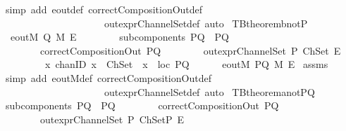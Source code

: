 \begin{isabellebody}
\ {\isacharparenleft}simp\ add{\isacharcolon}\ eout{\isacharunderscore}def\ correctCompositionOut{\isacharunderscore}def\ \isanewline
\ \ \ \ \ \ \ \ \ \ \ \ \ \ \ \ \ \ \ \ \ out{\isacharunderscore}exprChannelSet{\isacharunderscore}def{\isacharcomma}\ auto{\isacharparenright}%
\endisatagproof
{\isafoldproof}%
%
\isadelimproof
\isanewline
%
\endisadelimproof
\isanewline
{}\isamarkupfalse%
\ TBtheorem{}b{\isacharunderscore}notP{}{\isacharcolon}\isanewline
{}\ {\isachardoublequoteopen}{\isasymnot}\ eoutM\ Q\ M\ E{\isachardoublequoteclose}\isanewline
\ \ \ \ \ \ \ \ {\isachardoublequoteopen}subcomponents\ PQ\ {\isacharequal}\ {\isacharbraceleft}P{\isacharcomma}Q{\isacharbraceright}{\isachardoublequoteclose}\isanewline
\ \ \ \ \ \ \ \ {\isachardoublequoteopen}correctCompositionOut\ PQ{\isachardoublequoteclose}\isanewline
\ \ \ \ \ \ \ \ {\isachardoublequoteopen}out{\isacharunderscore}exprChannelSet\ P\ ChSet\ E{\isachardoublequoteclose}\isanewline
\ \ \ \ \ \ \ \ {\isachardoublequoteopen}{\isasymforall}\ {\isacharparenleft}x\ {\isacharcolon}{\isacharcolon}chanID{\isacharparenright}{\isachardot}\ {\isacharparenleft}{\isacharparenleft}x\ {\isasymin}\ ChSet{\isacharparenright}\ {\isasymlongrightarrow}\ {\isacharparenleft}x\ {\isasymin}\ {\isacharparenleft}loc\ PQ{\isacharparenright}{\isacharparenright}{\isacharparenright}{\isachardoublequoteclose}\ \isanewline
{}\ \ \ \ {\isachardoublequoteopen}{\isasymnot}\ eoutM\ PQ\ M\ E{\isachardoublequoteclose}\isanewline
%
\isadelimproof
%
\endisadelimproof
%
\isatagproof
{}\isamarkupfalse%
\ assms\isanewline
{}\isamarkupfalse%
\ {\isacharparenleft}simp\ add{\isacharcolon}\ eoutM{\isacharunderscore}def\ correctCompositionOut{\isacharunderscore}def\ \isanewline
\ \ \ \ \ \ \ \ \ \ \ \ \ \ \ \ \ \ \ \ \ out{\isacharunderscore}exprChannelSet{\isacharunderscore}def{\isacharcomma}\ auto{\isacharparenright}%
\endisatagproof
{\isafoldproof}%
%
\isadelimproof
\isanewline
%
\endisadelimproof
\isanewline
{}\isamarkupfalse%
\ TBtheorem{}a{\isacharunderscore}notPQ{\isacharcolon}\isanewline
{}\ {\isachardoublequoteopen}subcomponents\ PQ\ {\isacharequal}\ {\isacharbraceleft}P{\isacharcomma}Q{\isacharbraceright}{\isachardoublequoteclose}\isanewline
\ \ \ \ \ \ \ \ {\isachardoublequoteopen}correctCompositionOut\ PQ{\isachardoublequoteclose}\isanewline
\ \ \ \ \ \ \ \ {\isachardoublequoteopen}out{\isacharunderscore}exprChannelSet\ P\ ChSetP\ E{\isachardoublequoteclose}\isanewline

\end{isabellebody}
